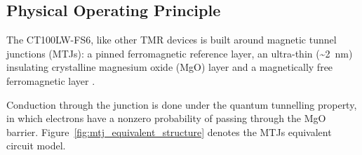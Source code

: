 \documentclass[12pt,a4paper]{article}
\begin{document}
\subsection{Physical Operating Principle}
\label{sec:ct100-principle}

The CT100LW-FS6, like other TMR devices is built around magnetic tunnel junctions (MTJs): a pinned ferromagnetic reference layer, an ultra-thin (\textasciitilde\SI{2}{\nano\metre}) insulating crystalline magnesium oxide (MgO) layer and a magnetically free ferromagnetic layer \cite{parkin2004,yuasa2004}. 

Conduction through the junction is done under the quantum tunnelling property, in which electrons have a nonzero probability of passing through the MgO barrier. Figure~\ref{fig:mtj_equivalent_structure} denotes the MTJs equivalent circuit model.
\end{document}
